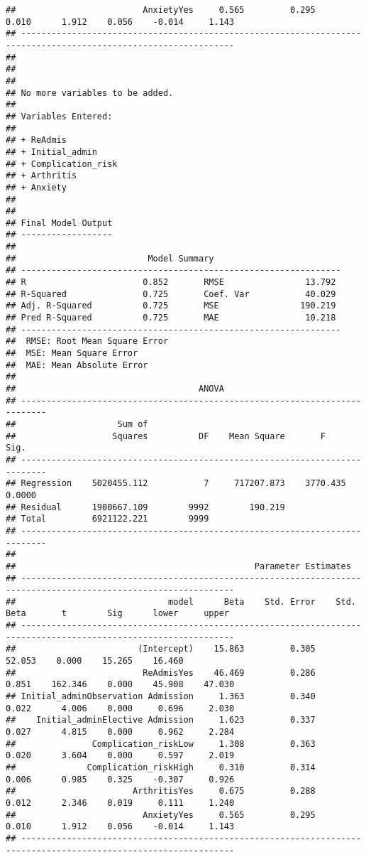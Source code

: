 \documentclass[
]{article}
\begin{document}
\begin{verbatim}
##                         AnxietyYes     0.565         0.295        0.010      1.912    0.056    -0.014     1.143 
## ----------------------------------------------------------------------------------------------------------------
## 
## 
## 
## No more variables to be added.
## 
## Variables Entered: 
## 
## + ReAdmis 
## + Initial_admin 
## + Complication_risk 
## + Arthritis 
## + Anxiety 
## 
## 
## Final Model Output 
## ------------------
## 
##                          Model Summary                          
## ---------------------------------------------------------------
## R                       0.852       RMSE                13.792 
## R-Squared               0.725       Coef. Var           40.029 
## Adj. R-Squared          0.725       MSE                190.219 
## Pred R-Squared          0.725       MAE                 10.218 
## ---------------------------------------------------------------
##  RMSE: Root Mean Square Error 
##  MSE: Mean Square Error 
##  MAE: Mean Absolute Error 
## 
##                                    ANOVA                                    
## ---------------------------------------------------------------------------
##                    Sum of                                                  
##                   Squares          DF    Mean Square       F          Sig. 
## ---------------------------------------------------------------------------
## Regression    5020455.112           7     717207.873    3770.435    0.0000 
## Residual      1900667.109        9992        190.219                       
## Total         6921122.221        9999                                      
## ---------------------------------------------------------------------------
## 
##                                               Parameter Estimates                                                
## ----------------------------------------------------------------------------------------------------------------
##                              model      Beta    Std. Error    Std. Beta       t        Sig      lower     upper 
## ----------------------------------------------------------------------------------------------------------------
##                        (Intercept)    15.863         0.305                  52.053    0.000    15.265    16.460 
##                         ReAdmisYes    46.469         0.286        0.851    162.346    0.000    45.908    47.030 
## Initial_adminObservation Admission     1.363         0.340        0.022      4.006    0.000     0.696     2.030 
##    Initial_adminElective Admission     1.623         0.337        0.027      4.815    0.000     0.962     2.284 
##               Complication_riskLow     1.308         0.363        0.020      3.604    0.000     0.597     2.019 
##              Complication_riskHigh     0.310         0.314        0.006      0.985    0.325    -0.307     0.926 
##                       ArthritisYes     0.675         0.288        0.012      2.346    0.019     0.111     1.240 
##                         AnxietyYes     0.565         0.295        0.010      1.912    0.056    -0.014     1.143 
## ----------------------------------------------------------------------------------------------------------------
\end{verbatim}
\end{document}
